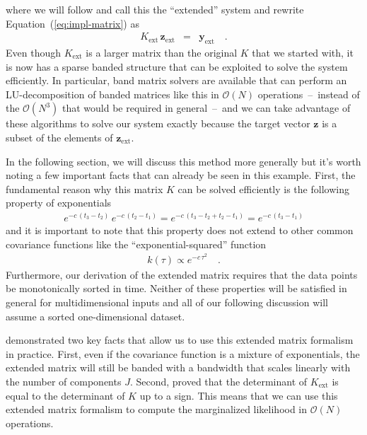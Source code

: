 \documentclass[manuscript, letterpaper]{aastex6}
\renewcommand{\eqref}[1]{\ref{eq:#1}}
\newcommand{\Eq}[1]{Equation~(\eqref{#1})}
\newcommand{\eq}[1]{\Eq{#1}}
\newcommand{\bvec}[1]{{\ensuremath{\boldsymbol{#1}}}}
\begin{document}
where we will follow \citet{Ambikasaran:2015} and call this the ``extended''
system and rewrite \eq{impl-matrix} as
\begin{eqnarray}
    K_\mathrm{ext}\,\bvec{z}_\mathrm{ext} &=& \bvec{y}_\mathrm{ext} \quad.
\end{eqnarray}
Even though $K_\mathrm{ext}$ is a larger matrix than the original $K$ that we
started with, it is now has a sparse banded structure that can be exploited to
solve the system efficiently.
In particular, band matrix solvers are available that can perform an
LU-decomposition of banded matrices like this in $\mathcal{O}(N)$
operations~--~instead of the $\mathcal{O}(N^3)$ that would be required in
general~--~and we can take advantage of these algorithms to solve our system
exactly because the target vector $\bvec{z}$ is a subset of the elements of
$\bvec{z}_\mathrm{ext}$.

In the following section, we will discuss this method more generally but it's
worth noting a few important facts that can already be seen in this example.
First, the fundamental reason why this matrix $K$ can be solved efficiently is
the following property of exponentials
\begin{eqnarray}
    e^{-c\,(t_3 - t_2)} \, e^{-c\,(t_2 - t_1)} =
    e^{-c\,(t_3 - t_2 + t_2 - t_1)} =
    e^{-c\,(t_3 - t_1)}
\end{eqnarray}
and it is important to note that this property does not extend to other common
covariance functions like the ``exponential-squared'' function
\begin{eqnarray}
    k(\tau) \propto e^{-c\,\tau^2} \quad.
\end{eqnarray}
Furthermore, our derivation of the extended matrix requires that the data
points be monotonically sorted in time.
Neither of these properties will be satisfied in general for multidimensional
inputs and all of our following discussion will assume a sorted
one-dimensional dataset.

\citet{Ambikasaran:2015} demonstrated two key facts that allow us to use this
extended matrix formalism in practice.
First, even if the covariance function is a mixture of exponentials, the
extended matrix will still be banded with a bandwidth that scales linearly
with the number of components $J$.
Second, \citet{Ambikasaran:2015} proved that the determinant of
$K_\mathrm{ext}$ is equal to the determinant of $K$ up to a sign.
This means that we can use this extended matrix formalism to compute the
marginalized likelihood in $\mathcal{O}(N)$ operations.
\end{document}
